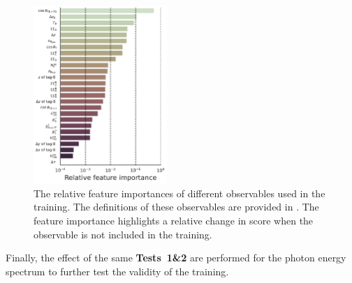 
\begin{figure}[htbp!]
    \includegraphics[width=0.45\textwidth]{figures/continuum_suppression/feature_importance.pdf}
    \caption{\label{fig:feature_importance} The relative feature importances of different observables used in the training.
    The definitions of these observables are provided in .
    The feature importance highlights a relative change in \AUC score when the observable is not included in the training.
    }
\end{figure}

Finally, the effect of the same \textbf{Tests~1\&2} are performed for the photon energy spectrum to further test the validity of the training.
